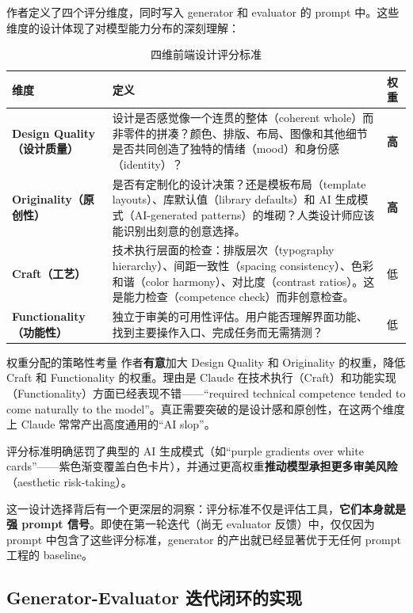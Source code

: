 \documentclass[a4paper]{article}
\begin{document}
作者定义了四个评分维度，同时写入 generator 和 evaluator 的 prompt 中。这些维度的设计体现了对模型能力分布的深刻理解：

\begin{table}[H]
\centering
\renewcommand{\arraystretch}{1.4}
\begin{tabular}{>{\bfseries}p{2.8cm}p{7.5cm}p{1.5cm}}
\toprule
维度 & 定义 & 权重 \\
\midrule
Design Quality（设计质量） & 设计是否感觉像一个连贯的整体（coherent whole）而非零件的拼凑？颜色、排版、布局、图像和其他细节是否共同创造了独特的情绪（mood）和身份感（identity）？ & \textbf{高} \\
\midrule
Originality（原创性） & 是否有定制化的设计决策？还是模板布局（template layouts）、库默认值（library defaults）和 AI 生成模式（AI-generated patterns）的堆砌？人类设计师应该能识别出刻意的创意选择。 & \textbf{高} \\
\midrule
Craft（工艺） & 技术执行层面的检查：排版层次（typography hierarchy）、间距一致性（spacing consistency）、色彩和谐（color harmony）、对比度（contrast ratios）。这是能力检查（competence check）而非创意检查。 & 低 \\
\midrule
Functionality（功能性） & 独立于审美的可用性评估。用户能否理解界面功能、找到主要操作入口、完成任务而无需猜测？ & 低 \\
\bottomrule
\end{tabular}
\caption{四维前端设计评分标准}
\end{table}

\begin{importantbox}{权重分配的策略性考量}
作者\textbf{有意}加大 Design Quality 和 Originality 的权重，降低 Craft 和 Functionality 的权重。理由是 Claude 在技术执行（Craft）和功能实现（Functionality）方面已经表现不错——``required technical competence tended to come naturally to the model''。真正需要突破的是设计感和原创性，在这两个维度上 Claude 常常产出高度通用的``AI slop''。

评分标准明确惩罚了典型的 AI 生成模式（如``purple gradients over white cards''——紫色渐变覆盖白色卡片），并通过更高权重\textbf{推动模型承担更多审美风险}（aesthetic risk-taking）。
\end{importantbox}

这一设计选择背后有一个更深层的洞察：评分标准不仅是评估工具，\textbf{它们本身就是强 prompt 信号}。即使在第一轮迭代（尚无 evaluator 反馈）中，仅仅因为 prompt 中包含了这些评分标准，generator 的产出就已经显著优于无任何 prompt 工程的 baseline。

\subsection{Generator-Evaluator 迭代闭环的实现}
\end{document}
